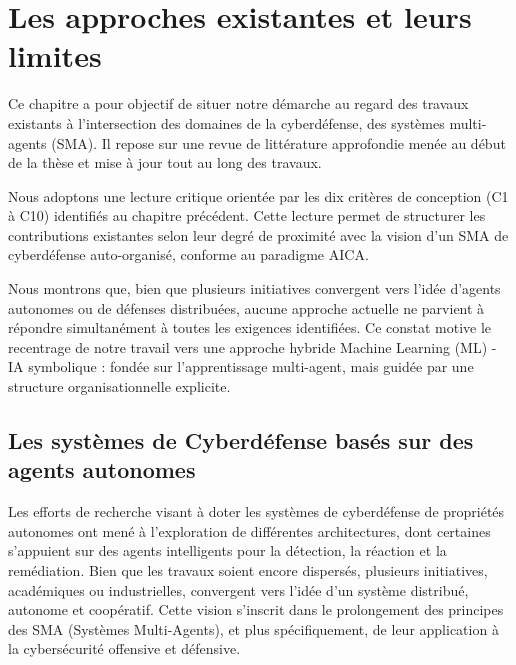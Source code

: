 \documentclass[ twoside,openright,titlepage,numbers=noenddot,headinclude,%
                footinclude=true,cleardoublepage=empty,abstractoff, %
                BCOR=5mm,paper=a4,fontsize=11pt,%
                french,american,%
                ]{scrreprt}
\begin{document}
\chapter{Les approches existantes et leurs limites}

\noindent
Ce chapitre a pour objectif de situer notre démarche au regard des travaux existants à l'intersection des domaines de la cyberdéfense, des systèmes multi-agents (SMA). Il repose sur une revue de littérature approfondie menée au début de la thèse et mise à jour tout au long des travaux.

Nous adoptons une lecture critique orientée par les dix critères de conception (C1 à C10) identifiés au chapitre précédent. Cette lecture permet de structurer les contributions existantes selon leur degré de proximité avec la vision d'un SMA de cyberdéfense auto-organisé, conforme au paradigme AICA.

Nous montrons que, bien que plusieurs initiatives convergent vers l'idée d'agents autonomes ou de défenses distribuées, aucune approche actuelle ne parvient à répondre simultanément à toutes les exigences identifiées. Ce constat motive le recentrage de notre travail vers une approche hybride Machine Learning (ML) - IA symbolique : fondée sur l'apprentissage multi-agent, mais guidée par une structure organisationnelle explicite.

\section{Les systèmes de Cyberdéfense basés sur des agents autonomes}\label{sec:revue-cyberdef-agent}

Les efforts de recherche visant à doter les systèmes de cyberdéfense de propriétés autonomes ont mené à l'exploration de différentes architectures, dont certaines s'appuient sur des agents intelligents pour la détection, la réaction et la remédiation. Bien que les travaux soient encore dispersés, plusieurs initiatives, académiques ou industrielles, convergent vers l'idée d'un système distribué, autonome et coopératif. Cette vision s'inscrit dans le prolongement des principes des SMA (Systèmes Multi-Agents), et plus spécifiquement, de leur application à la cybersécurité offensive et défensive.
\end{document}
